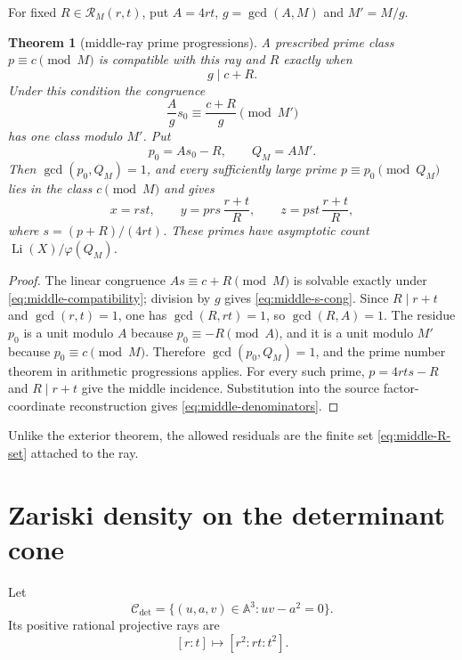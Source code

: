 \documentclass[11pt]{article}
\newtheorem{theorem}{Theorem}[section]
\theoremstyle{definition}
\theoremstyle{remark}
\newcommand{\Li}{\operatorname{Li}}
\newcommand{\1}{\mathbf 1}
\begin{document}
For fixed $R\in\mathscr R_M(r,t)$, put $A=4rt$, $g=\gcd(A,M)$ and
$M'=M/g$.

\begin{theorem}[middle-ray prime progressions]\label{thm:middle-progressions}
A prescribed prime class $p\equiv c\pmod M$ is compatible with this ray and
$R$ exactly when
\begin{equation}\label{eq:middle-compatibility}
 g\mid c+R.
\end{equation}
Under this condition the congruence
\begin{equation}\label{eq:middle-s-cong}
 \frac Ags_0\equiv\frac{c+R}{g}\pmod{M'}
\end{equation}
has one class modulo $M'$.  Put
\begin{equation}\label{eq:middle-p0Q}
 p_0=As_0-R,\qquad Q_M=AM'.
\end{equation}
Then $\gcd(p_0,Q_M)=1$, and every sufficiently large prime
$p\equiv p_0\pmod{Q_M}$ lies in the class $c\pmod M$ and gives
\begin{equation}\label{eq:middle-denominators}
 \boxed{
 x=rst,
 \qquad
 y=prs\,\frac{r+t}{R},
 \qquad
 z=pst\,\frac{r+t}{R},}
\end{equation}
where $s=(p+R)/(4rt)$.  These primes have asymptotic count
$\Li(X)/\varphi(Q_M)$.
\end{theorem}

\begin{proof}
The linear congruence $As\equiv c+R\pmod M$ is solvable exactly under
\eqref{eq:middle-compatibility}; division by $g$ gives
\eqref{eq:middle-s-cong}.  Since $R\mid r+t$ and $\gcd(r,t)=1$, one has
$\gcd(R,rt)=1$, so $\gcd(R,A)=1$.  The residue $p_0$ is a unit modulo $A$
because $p_0\equiv-R\pmod A$, and it is a unit modulo $M'$ because
$p_0\equiv c\pmod M$.  Therefore $\gcd(p_0,Q_M)=1$, and the prime number
theorem in arithmetic progressions applies.  For every such prime,
$p=4rts-R$ and $R\mid r+t$ give the middle incidence.  Substitution into the
source factor-coordinate reconstruction gives \eqref{eq:middle-denominators}.
\end{proof}

Unlike the exterior theorem, the allowed residuals are the finite set
\eqref{eq:middle-R-set} attached to the ray.

\section{Zariski density on the determinant cone}

Let
\begin{equation}\label{eq:det-cone}
 \mathscr C_{\det}=\{(u,a,v)\in\mathbb A^3:uv-a^2=0\}.
\end{equation}
Its positive rational projective rays are
\begin{equation}\label{eq:veronese}
 [r:t]\longmapsto[r^2:rt:t^2].
\end{equation}
\end{document}
